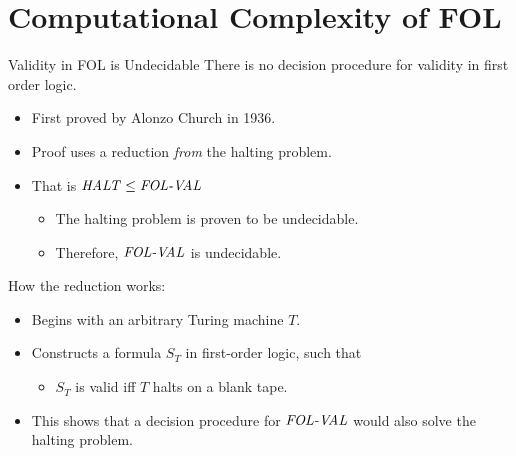 \documentclass[style=sailor,size=12pt]{powerdot}
\begin{document}
\section[slide=false]{Computational Complexity of FOL}
\begin{slide}[bm=,toc=]{Validity in FOL is Undecidable}
There is no decision procedure for validity in first order logic.
\begin{itemize}
\item First proved by Alonzo Church in 1936.
\item Proof uses a reduction \emph{from} the halting problem.
\item That is $\mbox{\it HALT\/} \leq \mbox{\it FOL-VAL\/}$
\begin{itemize}
\item The halting problem is proven to be undecidable.
\item Therefore, $\mbox{\it FOL-VAL\/}$ is undecidable.
\end{itemize}
\end{itemize}
How the reduction works:
\begin{itemize}
\item Begins with an arbitrary Turing machine $T$.
\item Constructs a formula $S_T$ in first-order logic, such that
\begin{itemize}
\item $S_T$ is valid iff $T$ halts on a blank tape.
\end{itemize}
\item This shows that a decision procedure for $\mbox{\it FOL-VAL\/}$ would also solve
the halting problem.
\end{itemize}
\end{slide}
\end{document}
